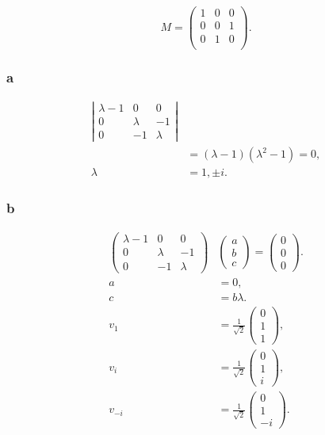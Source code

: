 \documentclass[a4paper,12pt,twoside]{article}
\begin{document}
\begin{multicols*}{2}
\subsection{}%
\begin{equation}
    M = \begin{pmatrix}
     1 & 0 & 0 \\
     0 & 0 & 1 \\
     0 & 1 & 0 \\
    \end{pmatrix}.
\end{equation}
\subsubsection*{a}
\begin{align}
    \left| \begin{matrix}
     \lambda-1 & 0 & 0 \\
     0 & \lambda & -1 \\
     0 & -1 & \lambda
    \end{matrix}\right|\!\!\!\!\!\!\!\!\!\!\!\!&\nonumber\\
    &= (\lambda-1)(\lambda^2-1) = 0,\\
    \lambda &= 1,\pm i.
\end{align}
\subsubsection*{b}
\begin{align}
    \begin{pmatrix}
     \lambda-1 & 0 & 0 \\
     0 & \lambda & -1 \\
     0 & -1 & \lambda
    \end{pmatrix}&
    \begin{pmatrix}
        a \\ b \\ c
    \end{pmatrix}
    = \begin{pmatrix}
        0 \\ 0 \\ 0
    \end{pmatrix}.\\
    a &= 0,\\
    c &= b\lambda.\\
    v_1 &= \frac{1}{\sqrt{2}}\begin{pmatrix}
        0 \\ 1 \\ 1
    \end{pmatrix},\\
    v_i &= \frac{1}{\sqrt{2}}\begin{pmatrix}
        0 \\ 1 \\ i
    \end{pmatrix},\\
    v_{-i} &= \frac{1}{\sqrt{2}}\begin{pmatrix}
        0 \\ 1 \\ -i
    \end{pmatrix}.
\end{align}

\end{multicols*}
\end{document}
